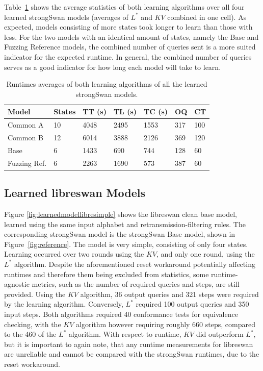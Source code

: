 Table~\ref{tab:runtime_summary_averages} shows the average statistics of both learning algorithms over all four learned strongSwan models (averages of $L^*$ and $KV$ combined in one cell). As expected, models consisting of more states took longer to learn than those with less. For the two models with an identical amount of states, namely the Base and Fuzzing Reference models, the combined number of queries sent is a more suited indicator for the expected runtime. In general, the combined number of queries serves as a good indicator for how long each model will take to learn. \\
\vspace{3mm}
\begin{table}[H]
	\centering
	\begin{tabular}{|l|l|l|l|l|l|l|}
		\hline
		\rowcolor[HTML]{C0C0C0} 
		Model    	& States & TT (s)   & TL (s)   	  & TC (s)   & OQ  & CT  \\ \hline
		Common A  	& 10     & 4048 	  & 2495	 	  & 1553 	 & 317 & 100 \\ \hline
		Common B  	& 12     & 6014 	  & 3888		  & 2126 	 & 369 & 120 \\ \hline
		Base      	& 6      & 1433 	  & 690 		  & 744  	 & 128 & 60  \\ \hline
		Fuzzing Ref.& 6      & 2263 	  & 1690		  & 573  	 & 387 & 60  \\ \hline
	\end{tabular}
	\caption{Runtimes averages of both learning algorithms of all the learned strongSwan models.}
	\label{tab:runtime_summary_averages}
\end{table}
\newpage

\subsection{Learned libreswan Models}
Figure \ref{fig:learnedmodellibresimple} shows the libreswan clean base model, learned using the same input alphabet and retransmission-filtering rules. The corresponding strongSwan model is the strongSwan Base model, shown in Figure~\ref{fig:reference}. The model is very simple, consisting of only four states. Learning occurred over two rounds using the $KV$, and only one round, using the $L^*$ algorithm. Despite the aforementioned reset workaround potentially affecting runtimes and therefore them being excluded from statistics, some runtime-agnostic metrics, such as the number of required queries and steps, are still provided. Using the $KV$ algorithm, 36 output queries and 321 steps were required by the learning algorithm. Conversely, $L^*$ required 100 output queries and 350 input steps. Both algorithms required 40 conformance tests for equivalence checking, with the $KV$ algorithm however requiring roughly 660 steps, compared to the 460 of the $L^*$ algorithm. With respect to runtime, $KV$ did outperform $L^*$, but it is important to again note, that any runtime measurements for libreswan are unreliable and cannot be compared with the strongSwan runtimes, due to the reset workaround.

